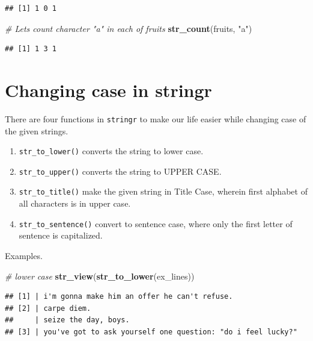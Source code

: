 \documentclass[
]{book}
\newenvironment{Shaded}{\begin{snugshade}}{\end{snugshade}}
\newcommand{\CommentTok}[1]{\textcolor[rgb]{0.56,0.35,0.01}{\textit{#1}}}
\newcommand{\FunctionTok}[1]{\textcolor[rgb]{0.13,0.29,0.53}{\textbf{#1}}}
\newcommand{\NormalTok}[1]{#1}
\newcommand{\StringTok}[1]{\textcolor[rgb]{0.31,0.60,0.02}{#1}}
\providecommand{\tightlist}{%
  \setlength{\itemsep}{0pt}\setlength{\parskip}{0pt}}
\begin{document}
\begin{verbatim}
## [1] 1 0 1
\end{verbatim}

\begin{Shaded}
\begin{Highlighting}[]
\CommentTok{\# Let\textquotesingle{}s count character "a" in each of \textasciigrave{}fruits\textasciigrave{}}
\FunctionTok{str\_count}\NormalTok{(fruits, }\StringTok{"a"}\NormalTok{)}
\end{Highlighting}
\end{Shaded}

\begin{verbatim}
## [1] 1 3 1
\end{verbatim}

\hypertarget{changing-case-in-stringr}{%
\section{Changing case in stringr}\label{changing-case-in-stringr}}

There are four functions in \texttt{stringr} to make our life easier while changing case of the given strings.

\begin{enumerate}
\def\labelenumi{\arabic{enumi}.}
\tightlist
\item
  \texttt{str\_to\_lower()} converts the string to lower case.
\item
  \texttt{str\_to\_upper()} converts the string to UPPER CASE.
\item
  \texttt{str\_to\_title()} make the given string in Title Case, wherein first alphabet of all characters is in upper case.
\item
  \texttt{str\_to\_sentence()} convert to sentence case, where only the first letter of sentence is capitalized.
\end{enumerate}

Examples.

\begin{Shaded}
\begin{Highlighting}[]
\CommentTok{\# lower case}
\FunctionTok{str\_view}\NormalTok{(}\FunctionTok{str\_to\_lower}\NormalTok{(ex\_lines))}
\end{Highlighting}
\end{Shaded}

\begin{verbatim}
## [1] | i'm gonna make him an offer he can't refuse.
## [2] | carpe diem.
##     | seize the day, boys.
## [3] | you've got to ask yourself one question: "do i feel lucky?"
\end{verbatim}
\end{document}
